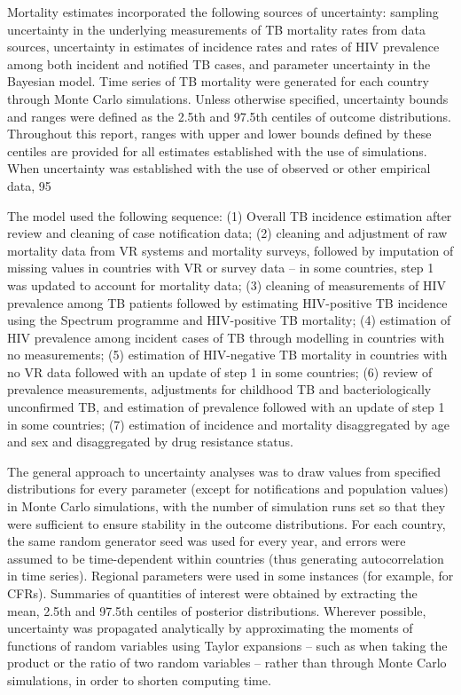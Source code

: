 Mortality estimates incorporated the following sources of uncertainty: sampling uncertainty in the underlying measurements of TB mortality rates from data sources, uncertainty in estimates of incidence rates and rates of HIV prevalence among both incident and notified TB cases, and parameter uncertainty in the Bayesian model. Time series of TB mortality were generated for each country through Monte Carlo simulations. 
Unless otherwise specified, uncertainty bounds and ranges were defined as the 2.5th and 97.5th centiles of outcome distributions. Throughout this report, ranges with upper and lower bounds defined by these centiles are provided for all estimates established with the use of simulations. When uncertainty was established with the use of observed or other empirical data, 95%
 
The model used the following sequence: (1) Overall TB incidence estimation after review and cleaning of case notification data; (2) cleaning and adjustment of raw mortality data from VR systems and mortality surveys, followed by imputation of missing values in countries with VR or survey data – in some countries, step 1 was updated to account for mortality data; (3) cleaning of measurements of HIV prevalence among TB patients followed by estimating HIV-positive TB incidence using the Spectrum programme and HIV-positive TB mortality; (4) estimation of HIV prevalence among incident cases of TB through modelling in countries with no measurements; (5) estimation of HIV-negative TB mortality in countries with no VR data followed with an update of step 1 in some countries; (6) review of prevalence measurements, adjustments for childhood TB and bacteriologically unconfirmed TB,  and estimation of prevalence followed with an update of step 1 in some countries; (7) estimation of incidence and mortality disaggregated by age and sex and disaggregated by drug resistance status.

The general approach to uncertainty analyses was to draw values from specified distributions for every parameter (except for notifications and population values) in Monte Carlo simulations, with the number of simulation runs set so that they were sufficient to ensure stability in the outcome distributions. For each country, the same random generator seed was used for every year, and errors were assumed to be time-dependent within countries (thus generating autocorrelation in time series). Regional parameters were used in some instances (for example, for CFRs). Summaries of quantities of interest were obtained by extracting the mean, 2.5th and 97.5th centiles of posterior distributions. Wherever possible, uncertainty was propagated analytically by approximating the moments of functions of random variables using Taylor expansions – such as when taking the product or the ratio of two random variables – rather than through Monte Carlo simulations, in order to shorten computing time. 

